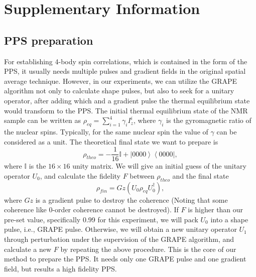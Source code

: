 \documentclass[6pt]{rspublic}
\begin{document}

\baselineskip14pt









\section*{Supplementary Information}


\subsection*{PPS preparation}

For establishing 4-body spin correlations, which is contained in the form of the PPS, it usually needs multiple pulses and gradient fields in the original spatial average technique. However, in our experiments, we can utilize the GRAPE algorithm not only to calculate shape pulses, but also to seek for a unitary operator, after adding which and a gradient pulse the thermal equilibrium state would transform to the PPS. The initial thermal equilibrium state of the NMR sample can be written as $\rho_{eq}=\sum\limits_{i=1}^4 \gamma_i I_z^i$, where $\gamma_i$ is the gyromagnetic ratio of the nuclear spins. Typically, for the same nuclear spin the value of $\gamma$ can be considered as a unit. The theoretical final state we want to prepare is
\begin{equation}\label{ppsform}
\rho_{theo}=-\frac{1}{16}\mathbb{{I}}+\left\vert 0000 \right\rangle \left\langle0000\right\vert,
\end{equation}
where ${\mathbb{{I}}}$ is the $16\times16$ unity matrix. We will give an initial guess of the unitary operator $U_0$, and calculate the fidelity $F$ between $\rho_{theo}$ and the final state
\begin{equation}\label{ppsform}
\rho_{fin}=Gz(U_0\rho_{eq}U_0^{\dagger}),
\end{equation}
where $Gz$ is a gradient pulse to destroy the coherence (Noting that some coherence like 0-order coherence cannot be destroyed). If $F$ is higher than our pre-set value, specifically 0.99 for this experiment, we will pack $U_0$ into a shape pulse, i.e., GRAPE pulse. Otherwise, we will obtain a new unitary operator $U_1$ through perturbation under the supervision of the GRAPE algorithm, and calculate a new  $F$ by repeating the above procedure. This is the core of our method to prepare the PPS. It needs only one GRAPE pulse and one gradient field, but results a high fidelity PPS.
\end{document}
